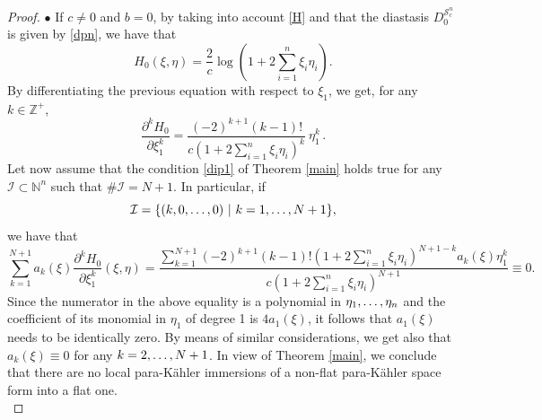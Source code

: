 \documentclass[10pt,a4paper]{amsart}
\newcommand{\I}{\mathcal{I}}
\newcommand{\N}{\mathds{N}}
\newcommand{\Z}{\mathds{Z}}
\newcommand{\de}{\partial}
\newcommand{\pk}{para-K\"ahler }
\newcommand{\s}{\mathcal{S}}
\begin{document}
\begin{proof}
\medskip
\noindent
$\bullet$ If $c\neq 0$ and $b= 0$, by taking into account   \eqref{H} and that the diastasis $D_0^{\s_c^n}$ is given by \eqref{dpn}, we have that
$$H_0(\xi,\eta)= \frac{2}{c}\log\left( 1+2\sum_{i=1}^n \xi_i\eta_i\right).$$
By differentiating the previous equation with respect to  $\xi_1$, we get, for any $k\in\Z^+$,
$$\frac{\de^k H_0}{\de \xi_1^{k}} = \frac{(-2)^{k+1}(k-1)!}{c \left( 1+2\sum_{i=1}^n \xi_i\eta_i\right)^k}\ \eta_1^k\,.$$
Let now assume that the condition \eqref{dip1} of Theorem \ref{main} holds true for any  $\I\subset \N^n$ such that $\#\I=N+1$. In particular, if 
\begin{equation}\label{II}
\I=\{(k,0,\mathellipsis,0)\ |\ k=1,\mathellipsis,N+1\},\end{equation}
we have that
$$\sum_{k=1}^{N+1} a_k(\xi) \frac{\de^k H_0}{\de \xi_1^{k}} (\xi,\eta)=\frac{ \sum_{k=1}^{N+1} (-2)^{k+1}(k-1)!  \left( 1+2\sum_{i=1}^n \xi_i\eta_i\right)^{N+1-k} a_k(\xi) \eta_1^k}{c \left( 1+2\sum_{i=1}^n \xi_i\eta_i\right)^{N+1}} \equiv 0.$$
%
%
%
Since the numerator in the above equality is a polynomial in $\eta_1,\mathellipsis,\eta_n$ and the coefficient of its monomial in $\eta_1$ of degree 1 is $4a_1(\xi)$, it follows that $a_1(\xi)$ needs to be identically zero.
 By means of similar considerations, we get also that $a_k(\xi)\equiv 0$ for any  $k=2,\mathellipsis,N+1$.
In view of  Theorem  \ref{main}, we  conclude that there  are no local  \pk immersions of a non-flat \pk space form into a flat one.\\



\end{proof}
\end{document}
